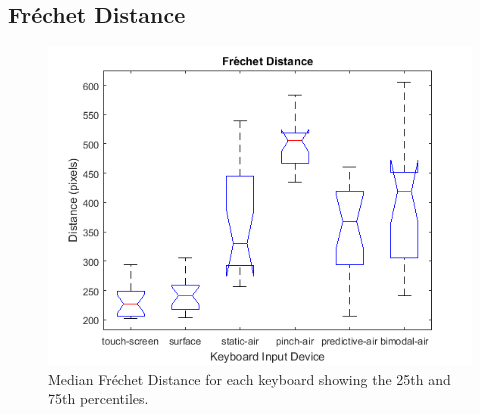 \subsection{Fr\'echet Distance}
\begin{figure}[h]
	\centering
	\includegraphics{fig_frechet_boxplot}
	\caption[Fr\'echet Distance Boxplot]{Median Fr\'echet Distance for each keyboard showing the 25th and 75th percentiles.}
	\label{fig_frechet_boxplot}
\end{figure}

